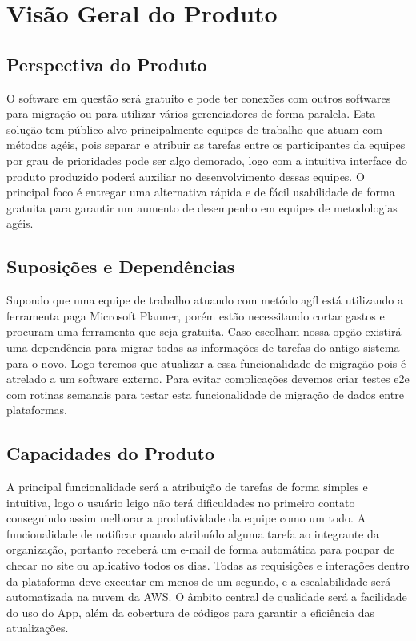 \chapter{Visão Geral do Produto}

\section{Perspectiva do Produto}
O software em questão será gratuito e pode ter conexões com outros softwares para migração ou para utilizar vários gerenciadores de forma paralela.
Esta solução tem público-alvo principalmente equipes de trabalho que atuam com métodos agéis, pois separar e atribuir as tarefas entre os participantes da equipes
por grau de prioridades pode ser algo demorado, logo com a intuitiva interface do produto produzido poderá auxiliar no desenvolvimento dessas equipes.
O principal foco é entregar uma alternativa rápida e de fácil usabilidade de forma gratuita para garantir um aumento de desempenho em equipes de metodologias agéis.

\section{Suposições e Dependências}
Supondo que uma equipe de trabalho atuando com metódo agíl está utilizando a ferramenta paga Microsoft Planner, porém estão necessitando cortar gastos e procuram uma ferramenta
que seja gratuita. Caso escolham nossa opção existirá uma dependência para migrar todas as informações de tarefas do antigo sistema para o novo. Logo teremos que atualizar a
essa funcionalidade de migração pois é atrelado a um software externo.
Para evitar complicações devemos criar testes \acrshort{e2e} com rotinas semanais para testar esta funcionalidade de migração de dados entre plataformas.

\section{Capacidades do Produto}
A principal funcionalidade será a atribuição de tarefas de forma simples e intuitiva, logo o usuário leigo não terá dificuldades no primeiro contato conseguindo assim
melhorar a produtividade da equipe como um todo. A funcionalidade de notificar quando atribuído alguma tarefa ao integrante da organização, portanto receberá um e-mail
de forma automática para poupar de checar no site ou aplicativo todos os dias.
Todas as requisições e interações dentro da plataforma deve executar em menos de um segundo, e a escalabilidade será automatizada na nuvem da AWS.
O âmbito central de qualidade será a facilidade do uso do App, além da cobertura de códigos para garantir a eficiência das atualizações.